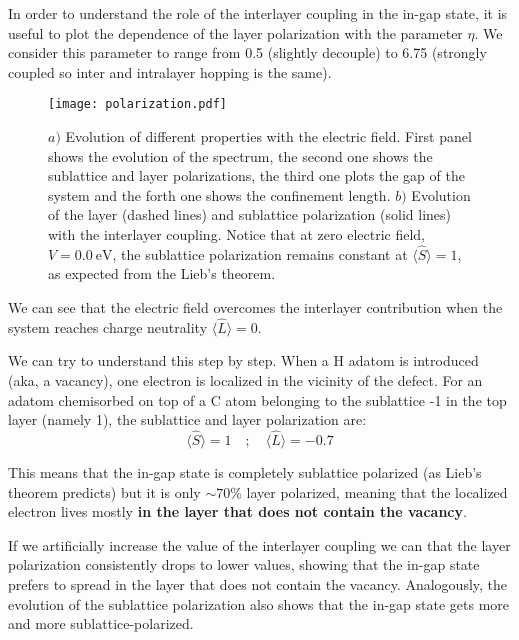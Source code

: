 \documentclass[a4paper]{article}
\begin{document}
In order to understand the role of the interlayer coupling in the in-gap state, it is useful to plot the dependence of the layer polarization with the parameter $\eta$. We consider this parameter to range from 0.5 (slightly decouple) to 6.75 (strongly coupled so inter and intralayer hopping is the same).
\begin{figure}[!ht!]
\centering
\texttt{[image: polarization.pdf]}
\vspace{-15pt}
\caption{$a)$ Evolution of different properties with the electric field. First panel shows the evolution of the spectrum, the second one shows the sublattice and layer polarizations, the third one plots the gap of the system and the forth one shows the confinement length. $b)$ Evolution of the layer (dashed lines) and sublattice polarization (solid lines) with the interlayer coupling. Notice that at zero electric field, $V=\SI{0.0}{\eV}$, the sublattice polarization remains constant at $\langle\hat{S}\rangle=1$, as expected from the Lieb's theorem.}
\label{pol}
\end{figure}
\FloatBarrier
We can see that the electric field overcomes the interlayer contribution when the system reaches charge neutrality $\langle\hat{L}\rangle=0$.

We can try to understand this step by step. When a H adatom is introduced (aka, a vacancy), one electron is localized in the vicinity of the defect. %
For an adatom chemisorbed on top of a C atom belonging to the sublattice -1 in the top layer (namely 1), the sublattice and layer polarization are:
\begin{equation*}
  \langle\hat{S}\rangle = 1 \quad;\quad
  \langle\hat{L}\rangle = -0.7
\end{equation*}

This means that the in-gap state is completely sublattice polarized (as Lieb's theorem predicts) but it is only $\sim70\%$ layer polarized, meaning that the localized electron lives mostly \textbf{in the layer that does not contain the vacancy}.

If we artificially increase the value of the interlayer coupling we can that the layer polarization consistently drops to lower values, showing that the in-gap state prefers to spread in the layer that does not contain the vacancy. Analogously, the evolution of the sublattice polarization also shows that the in-gap state gets more and more sublattice-polarized.
\end{document}

